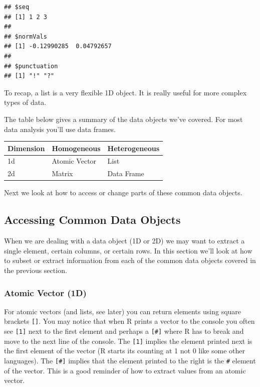 \documentclass[
]{book}
\theoremstyle{definition}
\theoremstyle{definition}
\theoremstyle{definition}
\theoremstyle{remark}
\begin{document}
\begin{verbatim}
## $seq
## [1] 1 2 3
## 
## $normVals
## [1] -0.12990285  0.04792657
## 
## $punctuation
## [1] "!" "?"
\end{verbatim}

To recap, a list is a very flexible 1D object. It is really useful for more complex types of data.

The table below gives a summary of the data objects we've covered. For most data analysis you'll use data frames.

\begin{longtable}[]{@{}lll@{}}
\toprule
Dimension & Homogeneous & Heterogeneous\tabularnewline
\midrule
\endhead
1d & Atomic Vector & List\tabularnewline
2d & Matrix & Data Frame\tabularnewline
\bottomrule
\end{longtable}

Next we look at how to access or change parts of these common data objects.

\hypertarget{accessing-common-data-objects}{%
\subsection{Accessing Common Data Objects}\label{accessing-common-data-objects}}

When we are dealing with a data object (1D or 2D) we may want to extract a single element, certain columns, or certain rows. In this section we'll look at how to subset or extract information from each of the common data objects covered in the previous section.

\hypertarget{atomic-vector-1d}{%
\subsubsection{Atomic Vector (1D)}\label{atomic-vector-1d}}

For atomic vectors (and lists, see later) you can return elements using square brackets \texttt{{[}{]}}. You may notice that when R prints a vector to the console you often see \texttt{{[}1{]}} next to the first element and perhaps a \texttt{{[}\#{]}} where R has to break and move to the next line of the console. The \texttt{{[}1{]}} implies the element printed next is the first element of the vector (R starts its counting at 1 not 0 like some other languages). The \texttt{{[}\#{]}} implies that the element printed to the right is the \texttt{\#} element of the vector. This is a good reminder of how to extract values from an atomic vector.
\end{document}
